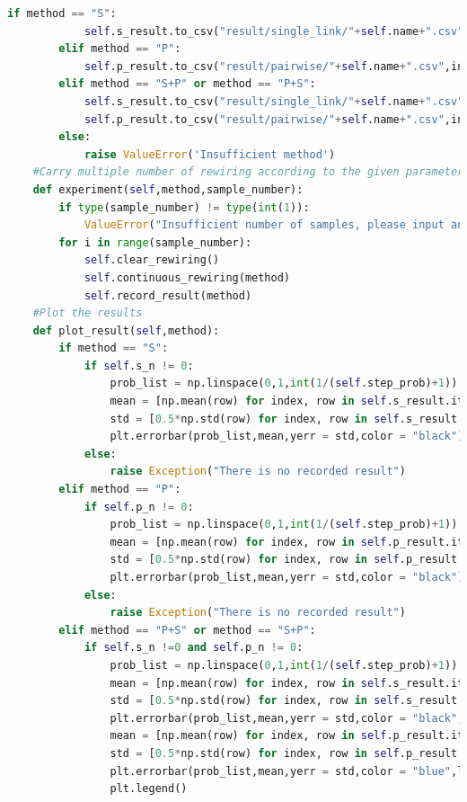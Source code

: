 \documentclass[12pt]{article}
\begin{document}
\begin{lstlisting}[breaklines=true,language=Python]
        if method == "S":
            self.s_result.to_csv("result/single_link/"+self.name+".csv",index = False)
        elif method == "P":
            self.p_result.to_csv("result/pairwise/"+self.name+".csv",index = False)
        elif method == "S+P" or method == "P+S":
            self.s_result.to_csv("result/single_link/"+self.name+".csv",index = False)
            self.p_result.to_csv("result/pairwise/"+self.name+".csv",index = False)
        else:
            raise ValueError('Insufficient method')
    #Carry multiple number of rewiring according to the given parameter
    def experiment(self,method,sample_number):
        if type(sample_number) != type(int(1)):
            ValueError("Insufficient number of samples, please input an integer.")        
        for i in range(sample_number):
            self.clear_rewiring()
            self.continuous_rewiring(method)            
            self.record_result(method)
    #Plot the results
    def plot_result(self,method):
        if method == "S":
            if self.s_n != 0:
                prob_list = np.linspace(0,1,int(1/(self.step_prob)+1))
                mean = [np.mean(row) for index, row in self.s_result.iterrows()]
                std = [0.5*np.std(row) for index, row in self.s_result.iterrows()]
                plt.errorbar(prob_list,mean,yerr = std,color = "black")
            else:
                raise Exception("There is no recorded result")
        elif method == "P":
            if self.p_n != 0:
                prob_list = np.linspace(0,1,int(1/(self.step_prob)+1))
                mean = [np.mean(row) for index, row in self.p_result.iterrows()]
                std = [0.5*np.std(row) for index, row in self.p_result.iterrows()]
                plt.errorbar(prob_list,mean,yerr = std,color = "black")
            else:
                raise Exception("There is no recorded result")
        elif method == "P+S" or method == "S+P":
            if self.s_n !=0 and self.p_n != 0:
                prob_list = np.linspace(0,1,int(1/(self.step_prob)+1))
                mean = [np.mean(row) for index, row in self.s_result.iterrows()]
                std = [0.5*np.std(row) for index, row in self.s_result.iterrows()]
                plt.errorbar(prob_list,mean,yerr = std,color = "black",label = "Single link rewiring")
                mean = [np.mean(row) for index, row in self.p_result.iterrows()]
                std = [0.5*np.std(row) for index, row in self.p_result.iterrows()]
                plt.errorbar(prob_list,mean,yerr = std,color = "blue",label = "Pairwise rewiring")
                plt.legend()

\end{lstlisting}
\end{document}
